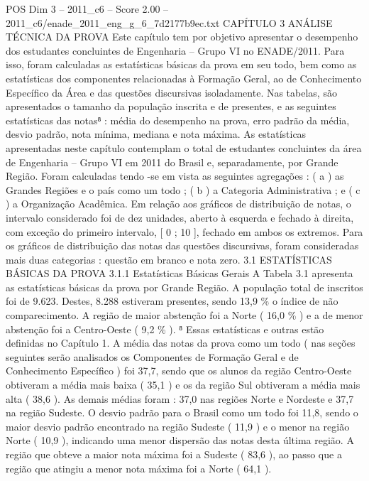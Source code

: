 \begin{textsample}{POS Dim 3 – 2011\_c6 – Score 2.00 – 2011\_c6/enade\_2011\_eng\_g\_6\_7d2177b9ec.txt}  \label{ex:f3_pos_206}
CAPÍTULO 3 ANÁLISE TÉCNICA DA PROVA Este capítulo tem por objetivo apresentar o desempenho dos estudantes concluintes de Engenharia – Grupo VI no ENADE/2011.
Para isso, foram calculadas as estatísticas básicas da prova em seu todo, bem como as estatísticas dos componentes relacionadas à Formação Geral, ao de Conhecimento Específico da Área e das questões discursivas isoladamente.
Nas tabelas, são apresentados o tamanho da população inscrita e de presentes, e as seguintes estatísticas das notas⁸ : média do desempenho na prova, erro padrão da média, desvio padrão, nota mínima, mediana e nota máxima.
As estatísticas apresentadas neste capítulo contemplam o total de estudantes concluintes da área de Engenharia – Grupo VI em 2011 do Brasil e, separadamente, por Grande Região.
Foram calculadas tendo -se em vista as seguintes agregações : ( a ) as Grandes Regiões e o país como um todo ; ( b ) a Categoria Administrativa ; e ( c ) a Organização Acadêmica.
Em relação aos gráficos de distribuição de notas, o intervalo considerado foi de dez unidades, aberto à esquerda e fechado à direita, com exceção do primeiro intervalo, [ 0 ; 10 ], fechado em ambos os extremos.
Para os gráficos de distribuição das notas das questões discursivas, foram consideradas mais duas categorias : questão em branco e nota zero. 3.1 ESTATÍSTICAS BÁSICAS DA PROVA 3.1.1 Estatísticas Básicas Gerais A Tabela 3.1 apresenta as estatísticas básicas da prova por Grande Região.
A população total de inscritos foi de 9.623.
Destes, 8.288 estiveram presentes, sendo 13,9 \% o índice de não comparecimento.
A região de maior abstenção foi a Norte ( 16,0 \% ) e a de menor abstenção foi a Centro-Oeste ( 9,2 \% ). ⁸ Essas estatísticas e outras estão definidas no Capítulo 1.
A média das notas da prova como um todo ( nas seções seguintes serão analisados os Componentes de Formação Geral e de Conhecimento Específico ) foi 37,7, sendo que os alunos da região Centro-Oeste obtiveram a média mais baixa ( 35,1 ) e os da região Sul obtiveram a média mais alta ( 38,6 ).
As demais médias foram : 37,0 nas regiões Norte e Nordeste e 37,7 na região Sudeste.
O desvio padrão para o Brasil como um todo foi 11,8, sendo o maior desvio padrão encontrado na região Sudeste ( 11,9 ) e o menor na região Norte ( 10,9 ), indicando uma menor dispersão das notas desta última região.
A região que obteve a maior nota máxima foi a Sudeste ( 83,6 ), ao passo que a região que atingiu a menor nota máxima foi a Norte ( 64,1 ).

\end{textsample}
